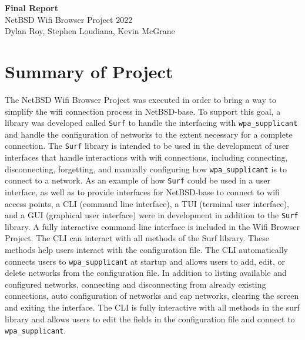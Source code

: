 \documentclass[11pt]{article}
\begin{document}
\begin{center}
  \textbf{\Large Final Report}\\\large NetBSD Wifi Browser Project 2022\\
  Dylan Roy, Stephen Loudiana, Kevin McGrane
\end{center}

\section*{Summary of Project}
The NetBSD Wifi Browser Project was executed in order to bring a way
to simplify the wifi connection process in NetBSD-base.
To support this goal, a library was developed called \texttt{Surf} to
handle the interfacing with \texttt{wpa\_supplicant} and handle the
configuration of networks to the extent necessary for a complete connection.
The \texttt{Surf} library is intended to be used in the development of
user interfaces that handle interactions with wifi connections, including
connecting, disconnecting, forgetting, and manually configuring how
\texttt{wpa\_supplicant} is to connect to a network.
As an example of how \texttt{Surf} could be used in a user interface, as
well as to provide interfaces for NetBSD-base to connect to wifi access points, 
a CLI (command line interface), a TUI (terminal user interface), and a GUI
(graphical user interface) were in development in addition to the \texttt{Surf} library. 
A fully interactive command line interface is included in the Wifi Browser Project. The 
CLI can interact with all methods of the Surf library. These methods help users interact 
with the configuration file. The CLI automatically connects users to \texttt{wpa\_supplicant} 
at startup and allows users to add, edit, or delete networks from the configuration file. 
In addition to listing available and configured networks, connecting and disconnecting from 
already existing connections, auto configuration of networks and eap networks, clearing 
the screen and exiting the interface. The CLI is fully interactive with all methods in the 
surf library and allows users to edit the fields in the configuration file and connect to 
\texttt{wpa\_supplicant}. 
\end{document}
